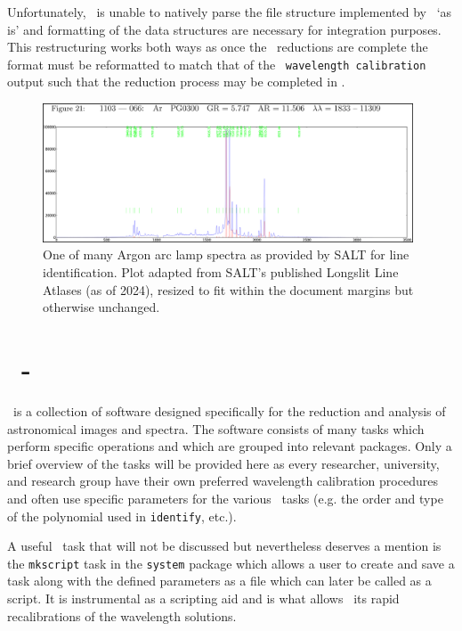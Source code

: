 Unfortunately, \iraf\ is unable to natively parse the file structure implemented by \polsalt\ `as is' and formatting of the data structures are necessary for integration purposes. This restructuring works both ways as once the \iraf\ reductions are complete the format must be reformatted to match that of the \polsalt\ \texttt{wavelength calibration} output such that the reduction process may be completed in \polsalt.

\begin{figure}[t]
    \centering
    \includegraphics[width = 0.98\textwidth]{figures/3_arc_spectrum.png}
    \caption{One of many Argon arc lamp spectra as provided by \gls{SALT} for line identification. Plot adapted from \gls{SALT}'s published Longslit Line Atlases (as of 2024), resized to fit within the document margins but otherwise unchanged.\protect\footnotemark}
    \label{fig:ar_arc_salt}
\end{figure}

\section[\iraf]{\iraf\ - } \label{sec:iraf}

\iraf\ is a collection of software designed specifically for the reduction and analysis of astronomical images and spectra. The software consists of many tasks which perform specific operations and which are grouped into relevant packages. Only a brief overview of the tasks will be provided here as every researcher, university, and research group have their own preferred wavelength calibration procedures and often use specific parameters for the various \iraf\ tasks (e.g. the order and type of the polynomial used in \texttt{identify}, etc.).

A useful \iraf\ task that will not be discussed but nevertheless deserves a mention is the \texttt{mkscript} task in the \texttt{system} package which allows a user to create and save a task along with the defined parameters as a file which can later be called as a script. It is instrumental as a scripting aid and is what allows \iraf\ its rapid recalibrations of the wavelength solutions.

